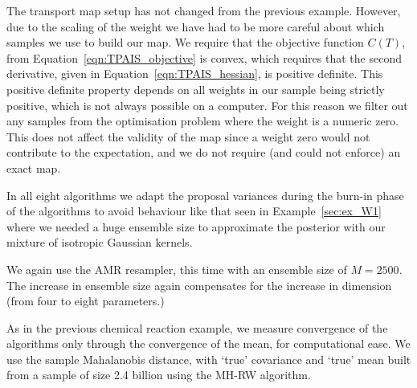 \documentclass[final]{siamltex}
\begin{document}
The transport map setup has not changed from the previous example. However, due to the scaling of the weight we have had to be more careful about which samples we use to build our map. We require that the objective function $C(T)$, from Equation~\eqref{eqn:TPAIS_objective} is convex, which requires that the second derivative, given in Equation~\eqref{eqn:TPAIS_hessian}, is positive definite. This positive definite property depends on all weights in our sample being strictly positive, which is not always possible on a computer. For this reason we filter out any samples from the optimisation problem where the weight is a numeric zero. This does not affect the validity of the map since a weight zero would not contribute to the expectation, and we do not require (and could not enforce) an exact map.

In all eight algorithms we adapt the proposal variances during the burn-in phase of the algorithms to avoid behaviour like that seen in Example~\ref{sec:ex_W1} where we needed a huge ensemble size to approximate the posterior with our mixture of isotropic Gaussian kernels.

We again use the AMR resampler, this time with an ensemble size of $M=2500$. The increase in ensemble size again compensates for the increase in dimension (from four to eight parameters.)

As in the previous chemical reaction example, we measure convergence of the algorithms only through the convergence of the mean, for computational ease. We use the sample Mahalanobis distance, with `true' covariance and `true' mean built from a sample of size 2.4 billion using the MH-RW algorithm.
\end{document}
